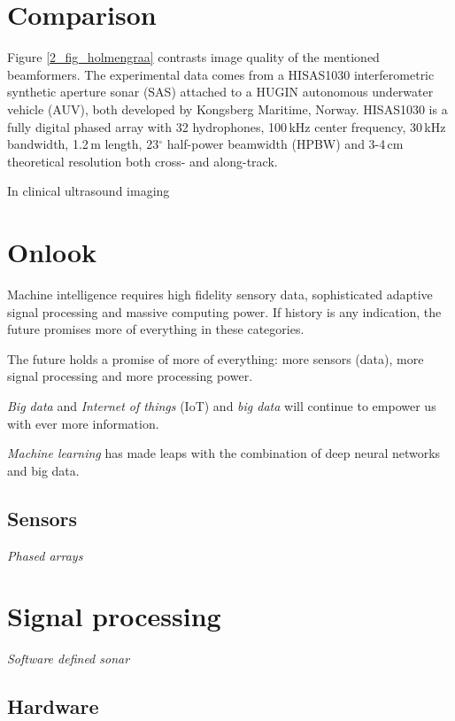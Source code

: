 \section{Comparison}

Figure \ref{2_fig_holmengraa} contrasts image quality of the mentioned beamformers. The experimental data comes from a HISAS1030 interferometric synthetic aperture sonar (SAS) attached to a HUGIN autonomous underwater vehicle (AUV), both developed by Kongsberg Maritime, Norway. HISAS1030 is a fully digital phased array with 32 hydrophones, 100\,kHz center frequency, 30\,kHz bandwidth, 1.2\,m length, 23$^\circ$ half-power beamwidth (HPBW) and 3-4\,cm theoretical resolution both cross- and along-track. 

In clinical ultrasound imaging 

\section{Onlook}


Machine intelligence requires high fidelity sensory data, sophisticated adaptive signal processing and massive computing power. If history is any indication, the future promises more of everything in these categories.

The future holds a promise of more of everything: more sensors (data), more signal processing and more processing power.

\emph{Big data} and \emph{Internet of things} (IoT) and \emph{big data} will continue to empower us with ever more information.  


\emph{Machine learning} has made leaps with the combination of deep neural networks and big data.  


\subsection{Sensors}

\emph{Phased arrays} 

\section{Signal processing}

\emph{Software defined sonar}


\subsection{Hardware}



